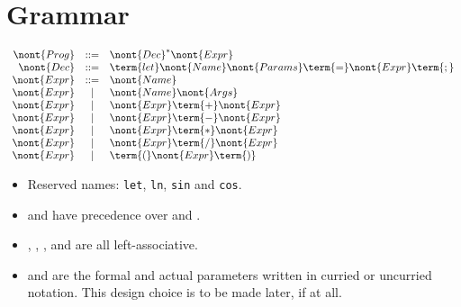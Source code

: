 \section{Grammar}

\label{section:grammar}

\[\begin{array}{rclr}
\nont{Prog}   &::=& \nont{Dec}^* \nont{Expr} \\
\nont{Dec}    &::=& \term{let} \nont{Name} \nont{Params}
                    \term{=} \nont{Expr} \term{;} \\
\nont{Expr}   &::=& \nont{Name} \\
\nont{Expr}   & | & \nont{Name} \nont{Args} \\
\nont{Expr}   & | & \nont{Expr} \term{+} \nont{Expr} \\
\nont{Expr}   & | & \nont{Expr} \term{-} \nont{Expr} \\
\nont{Expr}   & | & \nont{Expr} \term{*} \nont{Expr} \\
\nont{Expr}   & | & \nont{Expr} \term{/} \nont{Expr} \\
\nont{Expr}   & | & \term{(} \nont{Expr} \term{)} \\
\end{array}\]

\begin{itemize}

\item Reserved names: \texttt{let}, \texttt{ln}, \texttt{sin} and
\texttt{cos}.

\item \term{*} and \term{/} have precedence over \term{+} and \term{-}.

\item \term{+}, \term{-}, \term{*}, and \term{/} are all left-associative.

\item {} and  are the formal and actual parameters
written in curried or uncurried notation. This design choice is to be made
later, if at all.

\end{itemize}
